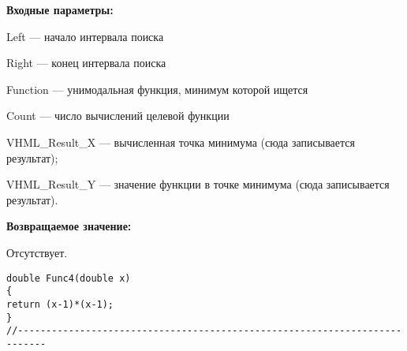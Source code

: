 \textbf{Входные параметры:}

 Left --- начало интервала поиска
 
Right --- конец интервала поиска
 
Function --- унимодальная функция, минимум которой ищется
 
Count --- число вычислений целевой функции
 
VHML\_Result\_X --- вычисленная точка минимума (сюда записывается результат);
 
VHML\_Result\_Y --- значение функции в точке минимума (сюда записывается результат).

\textbf{Возвращаемое значение:}
 
 Отсутствует.

\begin{lstlisting}[caption=Оптимизируемая функция]
double Func4(double x)
{
return (x-1)*(x-1);
}
//---------------------------------------------------------------------------
\end{lstlisting}